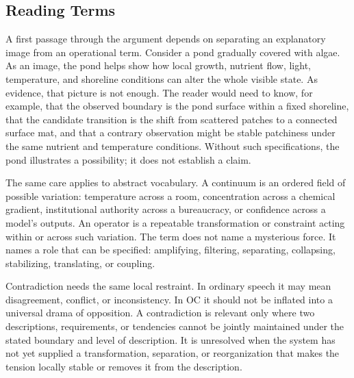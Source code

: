 \documentclass[11pt,a4paper,openany]{book}
\begin{document}
\subsection{Reading Terms}
A first passage through the argument depends on separating an explanatory image from an operational term. Consider a pond gradually covered with algae. As an image, the pond helps show how local growth, nutrient flow, light, temperature, and shoreline conditions can alter the whole visible state. As evidence, that picture is not enough. The reader would need to know, for example, that the observed boundary is the pond surface within a fixed shoreline, that the candidate transition is the shift from scattered patches to a connected surface mat, and that a contrary observation might be stable patchiness under the same nutrient and temperature conditions. Without such specifications, the pond illustrates a possibility; it does not establish a claim. \cite{prigogine_dissipative,haken_synergetics}\par
The same care applies to abstract vocabulary. A continuum is an ordered field of possible variation: temperature across a room, concentration across a chemical gradient, institutional authority across a bureaucracy, or confidence across a model's outputs. An operator is a repeatable transformation or constraint acting within or across such variation. The term does not name a mysterious force. It names a role that can be specified: amplifying, filtering, separating, collapsing, stabilizing, translating, or coupling.\par
Contradiction needs the same local restraint. In ordinary speech it may mean disagreement, conflict, or inconsistency. In OC it should not be inflated into a universal drama of opposition. A contradiction is relevant only where two descriptions, requirements, or tendencies cannot be jointly maintained under the stated boundary and level of description. It is unresolved when the system has not yet supplied a transformation, separation, or reorganization that makes the tension locally stable or removes it from the description.\par
\end{document}
